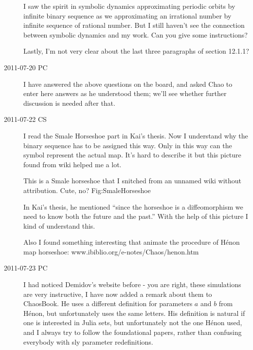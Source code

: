\begin{description}
I saw the spirit in symbolic dynamics approximating periodic orbits by
infinite binary sequence as we approximating an irrational number by
infinite sequence of rational number. But I still haven't see the
connection between symbolic dynamics and my work. Can you give some
instructions?

Lastly, I'm not very clear about the last three paragraphs of section
12.1.1?

\item[2011-07-20 PC] I have answered the above questions on the board,
and asked Chao to enter here answers as he understood them; we'll see
whether further discussion is needed after that.

\item[2011-07-22 CS] I read the Smale Horseshoe part in Kai's thesis. Now
I understand why the binary sequence has to be assigned this way. Only in
this way can the symbol represent the actual map. It's hard to describe
it but this picture found from wiki helped me a lot.

{}{
This is a Smale horseshoe that I snitched from an unnamed wiki
without attribution. Cute, no?
    }{Fig:SmaleHorseshoe}

In Kai's thesis, he mentioned ``since the horseshoe is a diffeomorphism
we need to know both the future and the past.'' With the help of this
picture I kind of understand this.

Also I found something interesting that animate the procedure of H\'enon
map horseshoe:
{www.ibiblio.org/e-notes/Chaos/henon.htm}

\item[2011-07-23 PC]                                        \inCB
I had noticed Demidov's website before - you are right, these simulations
are very instructive, I have now added a remark about them to ChaosBook.
He uses a different definition for parameters $a$ and $b$ from H\'enon,
but unfortunately uses the same letters. His definition is natural if one
is interested in Julia sets, but unfortunately not the one H\'enon used,
and I always try to follow the foundational papers, rather than confusing
everybody with sly parameter redefinitions.


\end{description}
